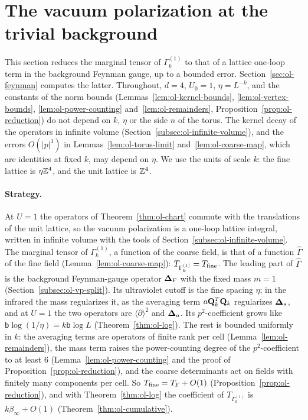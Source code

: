 \section{The vacuum polarization at the trivial background}\label{sec:ol-vacpol}

This section reduces the marginal tensor of $\Gamma^{(1)}_k$ to that of a lattice one-loop term in the background Feynman gauge, up to a bounded error. Section~\ref{sec:ol-feynman} computes the latter. Throughout, $d=4$, $U_0=1$, $\eta=L^{-k}$, and the constants of the norm bounds (Lemmas~\ref{lem:ol-kernel-bounds}, \ref{lem:ol-vertex-bounds}, \ref{lem:ol-power-counting} and~\ref{lem:ol-remainders}, Proposition~\ref{prop:ol-reduction}) do not depend on $k$, $\eta$ or the side $n$ of the torus. The kernel decay of the operators in infinite volume (Section~\ref{subsec:ol-infinite-volume}), and the errors $O(|p|^3)$ in Lemmas~\ref{lem:ol-torus-limit} and~\ref{lem:ol-coarse-map}, which are identities at fixed $k$, may depend on $\eta$. We use the units of scale $k$: the fine lattice is $\eta\mathbb Z^4$, and the unit lattice is $\mathbb Z^4$.

\paragraph{Strategy.} At $U=1$ the operators of Theorem~\ref{thm:ol-chart} commute with the translations of the unit lattice, so the vacuum polarization is a one-loop lattice integral, written in infinite volume with the tools of Section~\ref{subsec:ol-infinite-volume}. The marginal tensor of $\Gamma^{(1)}_k$, a function of the coarse field, is that of a function $\widehat\Gamma$ of the fine field (Lemma~\ref{lem:ol-coarse-map}): $T_{\Gamma^{(1)}_k}=T_{\rm fine}$. The leading part of $\widehat\Gamma$ is the background Feynman-gauge operator $\boldsymbol{\Delta}_{\rm F}$ with the fixed mass $m=1$ (Section~\ref{subsec:ol-vp-split}). Its ultraviolet cutoff is the fine spacing $\eta$; in the infrared the mass regularizes it, as the averaging term $a\mathbf Q_k^T\mathbf Q_k$ regularizes $\boldsymbol{\Delta}_*$, and at $U=1$ the two operators are $\langle\partial\rangle^2$ and $\boldsymbol{\Delta}_a$. Its $p^2$-coefficient grows like $\mathsf b\log(1/\eta)=k\mathsf b\log L$ (Theorem~\ref{thm:ol-log}). The rest is bounded uniformly in $k$: the averaging terms are operators of finite rank per cell (Lemma~\ref{lem:ol-remainders}), the mass term raises the power-counting degree of the $p^2$-coefficient to at least $6$ (Lemma~\ref{lem:ol-power-counting} and the proof of Proposition~\ref{prop:ol-reduction}), and the coarse determinants act on fields with finitely many components per cell. So $T_{\rm fine}=T_{\rm F}+O(1)$ (Proposition~\ref{prop:ol-reduction}), and with Theorem~\ref{thm:ol-log} the coefficient of $T_{\Gamma^{(1)}_k}$ is $k\beta_\infty+O(1)$ (Theorem~\ref{thm:ol-cumulative}).

